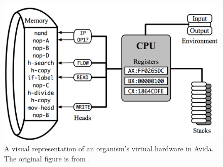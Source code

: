 \begin{figure}[h]
   \includegraphics[width=\columnwidth]{imgs/virtual_hardware}
  \caption{\small A visual representation of an organism's virtual hardware in Avida. The original figure is from \citep{Ofria:2009avida}.}
  \label{fig:vhardware}
\end{figure}